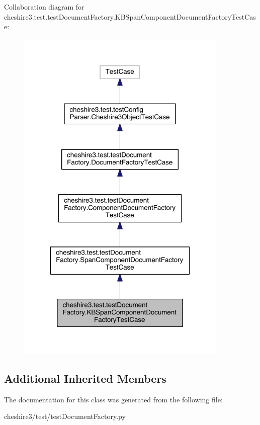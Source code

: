 Collaboration diagram for cheshire3.\-test.\-test\-Document\-Factory.\-K\-B\-Span\-Component\-Document\-Factory\-Test\-Case\-:
\nopagebreak
\begin{figure}[H]
\begin{center}
\leavevmode
\includegraphics[width=286pt]{classcheshire3_1_1test_1_1test_document_factory_1_1_k_b_span_component_document_factory_test_case__coll__graph}
\end{center}
\end{figure}
\subsection*{Additional Inherited Members}


The documentation for this class was generated from the following file\-:\begin{DoxyCompactItemize}
\item 
cheshire3/test/test\-Document\-Factory.\-py\end{DoxyCompactItemize}
